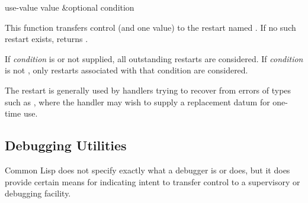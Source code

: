 \begin{defun}[Function]
use-value value &optional condition

  This function transfers control (and one value) to the restart named
  . If no such restart exists,  returns .
 
 If {\it condition} is  or not supplied, all outstanding restarts
are considered.
If {\it condition} is not , only restarts associated
with that condition are considered.

  The  restart is generally used by handlers trying to recover
  from errors of types such as , where the handler may wish to
  supply a replacement datum for one-time use.
\end{defun}


\subsection{Debugging Utilities}
\label{DEBUGGING-UTILITIES}

Common Lisp does not specify exactly what a debugger is or does,
but it does provide certain means for indicating intent to transfer control
to a supervisory or debugging facility.

